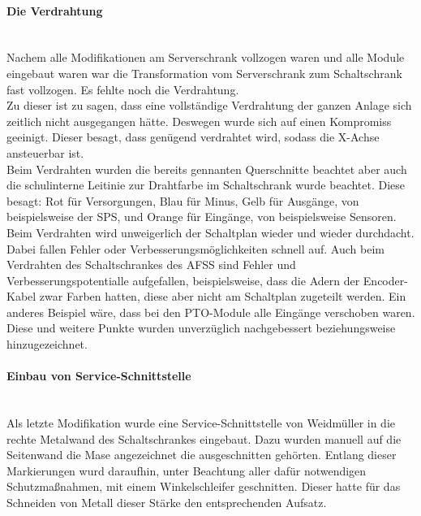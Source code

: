     \paragraph{Die Verdrahtung}\mbox{}\\
    Nachem alle Modifikationen am Serverschrank vollzogen waren und alle Module eingebaut waren war die Transformation vom Serverschrank zum Schaltschrank fast vollzogen. Es fehlte noch die Verdrahtung.\\
    Zu dieser ist zu sagen, dass eine vollständige Verdrahtung der ganzen Anlage sich zeitlich nicht ausgegangen hätte. Deswegen wurde sich auf einen Kompromiss geeinigt. Dieser besagt, dass genügend verdrahtet wird, sodass die X-Achse ansteuerbar ist.\\
    Beim Verdrahten wurden die bereits gennanten Querschnitte beachtet aber auch die schulinterne Leitinie zur Drahtfarbe im Schaltschrank wurde beachtet. Diese besagt: Rot für Versorgungen, Blau für Minus, Gelb für Ausgänge, von beispielsweise der SPS, und Orange für Eingänge, von  beispielsweise Sensoren.\\
    Beim Verdrahten wird unweigerlich der Schaltplan wieder und wieder durchdacht. Dabei fallen Fehler oder Verbesserungsmöglichkeiten schnell auf. Auch beim Verdrahten des Schaltschrankes des AFSS sind Fehler und Verbesserungspotentialle aufgefallen, beispielsweise, dass die Adern der Encoder-Kabel zwar Farben hatten, diese aber nicht am Schaltplan zugeteilt werden. Ein anderes Beispiel wäre, dass bei den PTO-Module alle Eingänge verschoben waren. Diese und weitere Punkte wurden unverzüglich nachgebessert beziehungsweise hinzugezeichnet.\\

    \paragraph{Einbau von Service-Schnittstelle}\mbox{}\\ 
    Als letzte Modifikation wurde eine Service-Schnittstelle von Weidmüller in die rechte Metalwand des Schaltschrankes eingebaut. Dazu wurden manuell auf die Seitenwand die Mase angezeichnet die ausgeschnitten gehörten. Entlang dieser Markierungen wurd daraufhin, unter Beachtung aller dafür notwendigen Schutzmaßnahmen, mit einem Winkelschleifer geschnitten. Dieser hatte für das Schneiden von Metall dieser Stärke den entsprechenden Aufsatz. 
